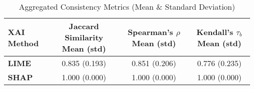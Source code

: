 \documentclass{article}
\begin{document}
\begin{table}[ht]
\centering
\caption{Aggregated Consistency Metrics (Mean \& Standard Deviation)}
\label{tab:consistency_metrics}
\begin{tabular}{lccc}
\toprule
\textbf{XAI Method} & \textbf{Jaccard Similarity Mean (std)} & \textbf{Spearman's $\rho$ Mean (std)} & \textbf{Kendall's $\tau_b$ Mean (std)} \\
\midrule
\textbf{LIME} & 0.835 (0.193) & 0.851 (0.206) & 0.776 (0.235) \\
\textbf{SHAP} & 1.000 (0.000) & 1.000 (0.000) & 1.000 (0.000) \\
\bottomrule
\end{tabular}
\end{table}
\end{document}
